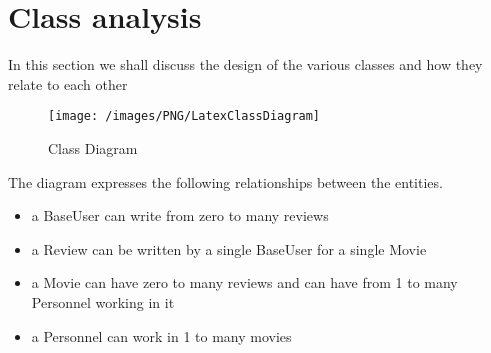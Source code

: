 \section{Class analysis}
In this section we shall discuss the design of the various classes and how they relate to each other
\begin{figure}[H]
\begin{center}
\texttt{[image: /images/PNG/LatexClassDiagram]}
\caption{Class Diagram}
\label{fig:UseCases}
\end{center}
\end{figure}
The diagram expresses the following relationships between the entities.
\begin{itemize}
	\item a BaseUser can write from zero to many reviews
	\item a Review can be written by a single BaseUser for a single Movie
	\item a Movie can have zero to many reviews and can have from 1 to many Personnel working in it
	\item a Personnel can work in 1 to many movies
\end{itemize}
%